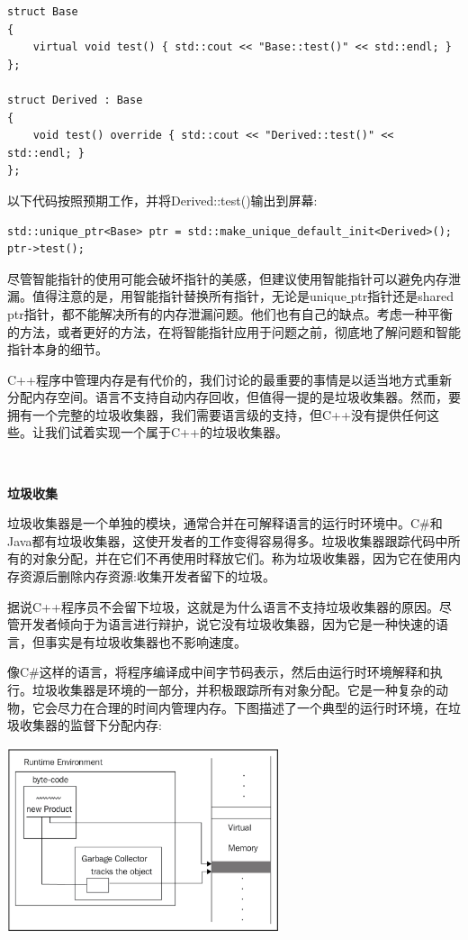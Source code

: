 \begin{lstlisting}[caption={}]
struct Base
{
	virtual void test() { std::cout << "Base::test()" << std::endl; }
};

struct Derived : Base
{
	void test() override { std::cout << "Derived::test()" << std::endl; }
};
\end{lstlisting}

以下代码按照预期工作，并将Derived::test()输出到屏幕:\par

\begin{lstlisting}[caption={}]
std::unique_ptr<Base> ptr = std::make_unique_default_init<Derived>();
ptr->test();
\end{lstlisting}

尽管智能指针的使用可能会破坏指针的美感，但建议使用智能指针可以避免内存泄漏。值得注意的是，用智能指针替换所有指针，无论是unique\underline{ }ptr指针还是shared\underline{ }ptr指针，都不能解决所有的内存泄漏问题。他们也有自己的缺点。考虑一种平衡的方法，或者更好的方法，在将智能指针应用于问题之前，彻底地了解问题和智能指针本身的细节。 \par
C++程序中管理内存是有代价的，我们讨论的最重要的事情是以适当地方式重新分配内存空间。语言不支持自动内存回收，但值得一提的是垃圾收集器。然而，要拥有一个完整的垃圾收集器，我们需要语言级的支持，但C++没有提供任何这些。让我们试着实现一个属于C++的垃圾收集器。 \par

\noindent\textbf{}\ \par
\textbf{垃圾收集} \ \par
垃圾收集器是一个单独的模块，通常合并在可解释语言的运行时环境中。C\#和Java都有垃圾收集器，这使开发者的工作变得容易得多。垃圾收集器跟踪代码中所有的对象分配，并在它们不再使用时释放它们。称为垃圾收集器，因为它在使用内存资源后删除内存资源:收集开发者留下的垃圾。\par
据说C++程序员不会留下垃圾，这就是为什么语言不支持垃圾收集器的原因。尽管开发者倾向于为语言进行辩护，说它没有垃圾收集器，因为它是一种快速的语言，但事实是有垃圾收集器也不影响速度。 \par
像C\#这样的语言，将程序编译成中间字节码表示，然后由运行时环境解释和执行。垃圾收集器是环境的一部分，并积极跟踪所有对象分配。它是一种复杂的动物，它会尽力在合理的时间内管理内存。下图描述了一个典型的运行时环境，在垃圾收集器的监督下分配内存: \par

\begin{center}
	\includegraphics[width=0.6\textwidth]{content/Section-1/Chapter-5/14}
\end{center}

